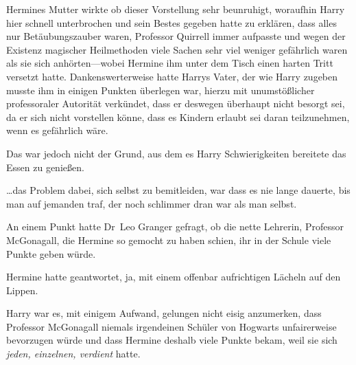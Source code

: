 Hermines Mutter wirkte ob dieser Vorstellung sehr beunruhigt, woraufhin Harry hier schnell unterbrochen und sein Bestes gegeben hatte zu erklären, dass alles nur Betäubungszauber waren, Professor Quirrell immer aufpasste und wegen der Existenz magischer Heilmethoden viele Sachen sehr viel weniger gefährlich waren als sie sich anhörten—wobei Hermine ihm unter dem Tisch einen harten Tritt versetzt hatte. Dankenswerterweise hatte Harrys Vater, der wie Harry zugeben musste ihm in einigen Punkten überlegen war, hierzu mit unumstößlicher professoraler Autorität verkündet, dass er deswegen überhaupt nicht besorgt sei, da er sich nicht vorstellen könne, dass es Kindern erlaubt sei daran teilzunehmen, wenn es gefährlich wäre.

Das war jedoch nicht der Grund, aus dem es Harry Schwierigkeiten bereitete das Essen zu genießen.

…das Problem dabei, sich selbst zu bemitleiden, war dass es nie lange dauerte, bis man auf jemanden traf, der noch schlimmer dran war als man selbst.

An einem Punkt hatte Dr~Leo Granger gefragt, ob die nette Lehrerin, Professor McGonagall, die Hermine so gemocht zu haben schien, ihr in der Schule viele Punkte geben würde.

Hermine hatte geantwortet, ja, mit einem offenbar aufrichtigen Lächeln auf den Lippen.

Harry war es, mit einigem Aufwand, gelungen nicht eisig anzumerken, dass Professor McGonagall niemals irgendeinen Schüler von Hogwarts unfairerweise bevorzugen würde und dass Hermine deshalb viele Punkte bekam, weil sie sich \emph{jeden, einzelnen, verdient} hatte.

